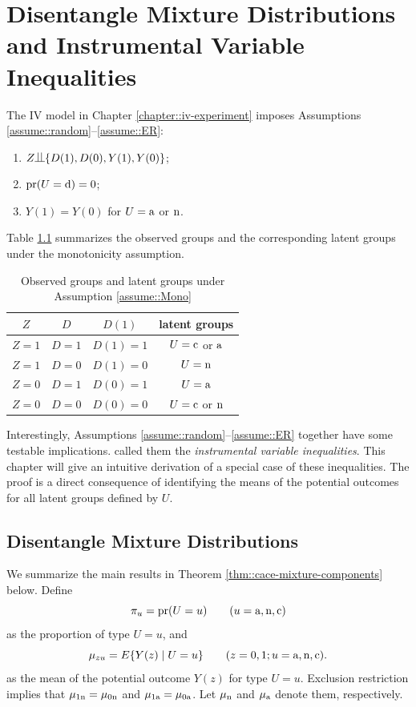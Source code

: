  
\chapter{Disentangle Mixture Distributions and Instrumental Variable Inequalities}
 \label{chapter::iv-inequalities}

 
 The IV model in Chapter \ref{chapter::iv-experiment} imposes  Assumptions \ref{assume::random}--\ref{assume::ER}:
 \begin{enumerate}
 \item
 $Z\ind \{D(1), D(0) ,Y(1), Y(0)   \}$;
 \item
 $\textup{pr}(U = \textup{d}) = 0$;
 \item 
 $Y(1) = Y(0)$ for $U=\textup{a}$ or  $\textup{n}$. 
 \end{enumerate}


Table \ref{table::obs-latent} summarizes the observed groups and the corresponding latent groups under the monotonicity assumption. 


\begin{table}[h]
\centering
\caption{Observed groups and latent groups under Assumption \ref{assume::Mono} }\label{table::obs-latent}
\begin{tabular}{cccc}
\hline 
$Z$ & $D$ & $D(1)$ & latent groups \\
\hline 
$Z=1$ & $D=1$ & $D(1) = 1$ & $U = \textup{c}$ or $\textup{a}$ \\
$Z=1$ & $D=0$ & $D(1) = 0$ & $U = \textup{n}$ \\ 
$Z=0$ & $D=1$ & $D(0) = 1$ & $U = \textup{a}$  \\ 
$Z=0$ & $D=0$ & $D(0) = 0$ & $U = \textup{c}$ or $\textup{n}$ \\
\hline 
\end{tabular}
\end{table}


Interestingly, Assumptions \ref{assume::random}--\ref{assume::ER} together have some testable implications. \citet{balke1997bounds} called them the {\it instrumental variable inequalities}. This chapter will give an intuitive derivation of a special case of these inequalities. The proof is a direct consequence of identifying the means of the potential outcomes for all latent groups defined by $U$. 

\section{Disentangle Mixture Distributions}
\label{sec::disentangle-mixtures}


We summarize the main results in Theorem \ref{thm::cace-mixture-components} below. 
Define 
$$
\pi_u = \textup{pr}(U = u) \quad  \quad  (u=\textup{a}, \textup{n}, \textup{c}) 
$$ as the proportion of type $U=u$, and
$$
\mu_{zu} = E\{  Y(z) \mid U = u\}\quad  \quad (z=0,1;u=\textup{a}, \textup{n}, \textup{c}) .
$$ 
as the mean of the potential outcome $Y(z) $ for type $U=u$. 
Exclusion restriction implies that $\mu_{1\textup{n}} = \mu_{0\textup{n}} $ and $\mu_{1\textup{a}} = \mu_{0\textup{a}} $. Let $\mu_{\textup{n}}$ and $\mu_{\textup{a}} $ denote them, respectively.

